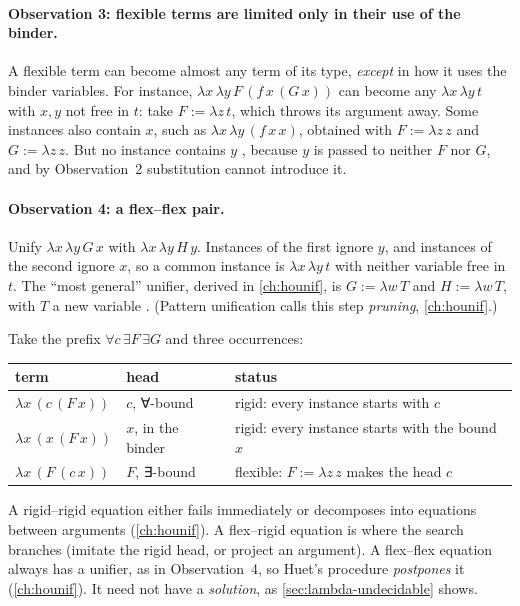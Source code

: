 {\paragraph{Observation 3: flexible terms are limited only in their use of the binder.} A flexible term
can become almost any term of its type, \emph{except} in how it uses the binder variables. For
instance, $\lambda x\,\lambda y\,F\,(f\,x\,(G\,x))$ can become any $\lambda x\,\lambda y\,t$ with $x,y$ not
free in $t$: take $F:=\lambda z\,t$, which throws its argument away. Some instances also contain $x$,
such as $\lambda x\,\lambda y\,(f\,x\,x)$, obtained with $F:=\lambda z\,z$ and $G:=\lambda z\,z$. But no
instance contains $y$ , because $y$ is passed to neither $F$ nor $G$, and by Observation~2
substitution cannot introduce it.

\paragraph{Observation 4: a flex–flex pair.} Unify $\lambda x\,\lambda y\,G\,x$ with
$\lambda x\,\lambda y\,H\,y$. Instances of the first ignore $y$, and instances of the second ignore $x$, so a
common instance is $\lambda x\,\lambda y\,t$ with neither variable free in $t$. The \enquote{most general}
unifier, derived in \cref{ch:hounif}, is $G:=\lambda w\,T$ and $H:=\lambda w\,T$, with $T$ a new variable
. (Pattern unification calls this step \emph{pruning}, \cref{ch:hounif}.)

\begin{tutorial}
Take the prefix $\forall c\,\exists F\,\exists G$ and three occurrences:
\begin{center}
\begin{tabular}{@{}lll@{}}
\toprule
term & head & status\\
\midrule
$\lambda x\,(c\,(F\,x))$ & $c$, ∀-bound & rigid: every instance starts with $c$\\
$\lambda x\,(x\,(F\,x))$ & $x$, in the binder & rigid: every instance starts with the bound $x$\\
$\lambda x\,(F\,(c\,x))$ & $F$, ∃-bound & flexible: $F:=\lambda z\,z$ makes the head $c$\\
\bottomrule
\end{tabular}
\end{center}
A rigid–rigid equation either fails immediately or decomposes into equations between arguments
(\cref{ch:hounif}). A flex–rigid equation is where the search branches (imitate the rigid head, or
project an argument). A flex–flex equation always has a unifier, as in Observation~4, so Huet's
procedure \emph{postpones} it (\cref{ch:hounif}). It need not have a \emph{solution}, as
\cref{sec:lambda-undecidable} shows.
\end{tutorial}

}
